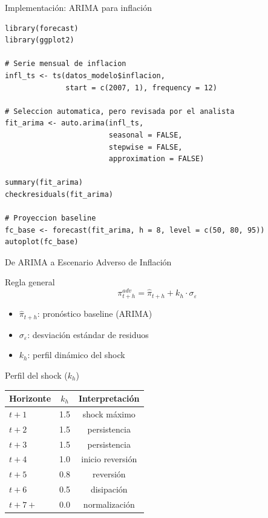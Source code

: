 \documentclass[10pt,aspectratio=169]{beamer}
\begin{document}
\begin{frame}[fragile]{Implementación: ARIMA para inflación}
\begin{lstlisting}
library(forecast)
library(ggplot2)

# Serie mensual de inflacion
infl_ts <- ts(datos_modelo$inflacion,
              start = c(2007, 1), frequency = 12)

# Seleccion automatica, pero revisada por el analista
fit_arima <- auto.arima(infl_ts,
                        seasonal = FALSE,
                        stepwise = FALSE,
                        approximation = FALSE)

summary(fit_arima)
checkresiduals(fit_arima)

# Proyeccion baseline
fc_base <- forecast(fit_arima, h = 8, level = c(50, 80, 95))
autoplot(fc_base)
\end{lstlisting}
\end{frame}

\begin{frame}{De ARIMA a Escenario Adverso de Inflación}
  \footnotesize
\begin{block}{Regla general}
\[
\pi^{adv}_{t+h} = \hat{\pi}_{t+h} + k_h \cdot \sigma_{\varepsilon}
\]
\end{block}

\begin{itemize}
\item $\hat{\pi}_{t+h}$: pronóstico baseline (ARIMA)
\item $\sigma_{\varepsilon}$: desviación estándar de residuos
\item $k_h$: perfil dinámico del shock
\end{itemize}

\vspace{0.4cm}

\begin{block}{Perfil del shock ($k_h$)}
\begin{center}
\begin{tabular}{lcc}
\toprule
Horizonte & $k_h$ & Interpretación \\
\midrule
$t+1$ & 1.5 & shock máximo \\
$t+2$ & 1.5 & persistencia \\
$t+3$ & 1.5 & persistencia \\
$t+4$ & 1.0 & inicio reversión \\
$t+5$ & 0.8 & reversión \\
$t+6$ & 0.5 & disipación \\
$t+7+$ & 0.0 & normalización \\
\bottomrule
\end{tabular}
\end{center}
\end{block}
\end{frame}
\end{document}
